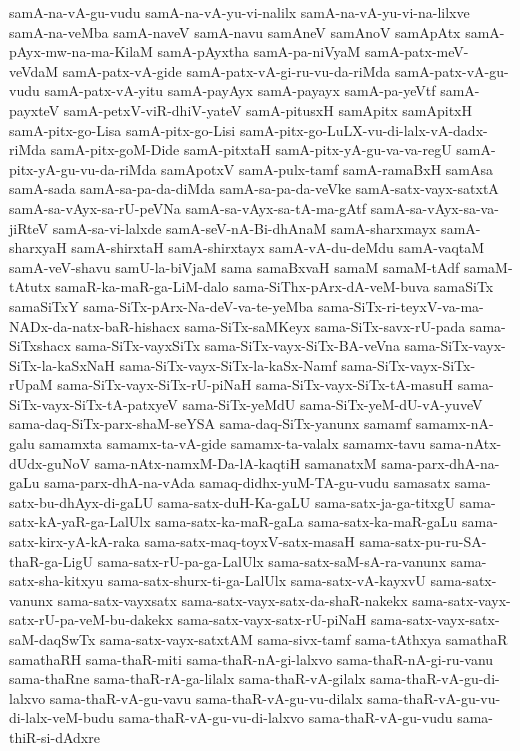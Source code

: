 {samA-na-vA-gu-vudu
samA-na-vA-yu-vi-nalilx
samA-na-vA-yu-vi-na-lilxve
samA-na-veMba
samA-naveV
samA-navu
samAneV
samAnoV
samApAtx
samA-pAyx-mw-na-ma-KilaM
samA-pAyxtha
samA-pa-niVyaM
samA-patx-meV-veVdaM
samA-patx-vA-gide
samA-patx-vA-gi-ru-vu-da-riMda
samA-patx-vA-gu-vudu
samA-patx-vA-yitu
samA-payAyx
samA-payayx
samA-pa-yeVtf
samA-payxteV
samA-petxV-viR-dhiV-yateV
samA-pitusxH
samApitx
samApitxH
samA-pitx-go-Lisa
samA-pitx-go-Lisi
samA-pitx-go-LuLX-vu-di-lalx-vA-dadx-riMda
samA-pitx-goM-Dide
samA-pitxtaH
samA-pitx-yA-gu-va-va-regU
samA-pitx-yA-gu-vu-da-riMda
samApotxV
samA-pulx-tamf
samA-ramaBxH
samAsa
samA-sada
samA-sa-pa-da-diMda
samA-sa-pa-da-veVke
samA-satx-vayx-satxtA
samA-sa-vAyx-sa-rU-peVNa
samA-sa-vAyx-sa-tA-ma-gAtf
samA-sa-vAyx-sa-va-jiRteV
samA-sa-vi-lalxde
samA-seV-nA-Bi-dhAnaM
samA-sharxmayx
samA-sharxyaH
samA-shirxtaH
samA-shirxtayx
samA-vA-du-deMdu
samA-vaqtaM
samA-veV-shavu
samU-la-biVjaM
sama
samaBxvaH
samaM
samaM-tAdf
samaM-tAtutx
samaR-ka-maR-ga-LiM-dalo
sama-SiThx-pArx-dA-veM-buva
samaSiTx
samaSiTxY
sama-SiTx-pArx-Na-deV-va-te-yeMba
sama-SiTx-ri-teyxV-va-ma-NADx-da-natx-baR-hishacx
sama-SiTx-saMKeyx
sama-SiTx-savx-rU-pada
sama-SiTxshacx
sama-SiTx-vayxSiTx
sama-SiTx-vayx-SiTx-BA-veVna
sama-SiTx-vayx-SiTx-la-kaSxNaH
sama-SiTx-vayx-SiTx-la-kaSx-Namf
sama-SiTx-vayx-SiTx-rUpaM
sama-SiTx-vayx-SiTx-rU-piNaH
sama-SiTx-vayx-SiTx-tA-masuH
sama-SiTx-vayx-SiTx-tA-patxyeV
sama-SiTx-yeMdU
sama-SiTx-yeM-dU-vA-yuveV
sama-daq-SiTx-parx-shaM-seYSA
sama-daq-SiTx-yanunx
samamf
samamx-nA-galu
samamxta
samamx-ta-vA-gide
samamx-ta-valalx
samamx-tavu
sama-nAtx-dUdx-guNoV
sama-nAtx-namxM-Da-lA-kaqtiH
samanatxM
sama-parx-dhA-na-gaLu
sama-parx-dhA-na-vAda
samaq-didhx-yuM-TA-gu-vudu
samasatx
sama-satx-bu-dhAyx-di-gaLU
sama-satx-duH-Ka-gaLU
sama-satx-ja-ga-titxgU
sama-satx-kA-yaR-ga-LalUlx
sama-satx-ka-maR-gaLa
sama-satx-ka-maR-gaLu
sama-satx-kirx-yA-kA-raka
sama-satx-maq-toyxV-satx-masaH
sama-satx-pu-ru-SA-thaR-ga-LigU
sama-satx-rU-pa-ga-LalUlx
sama-satx-saM-sA-ra-vanunx
sama-satx-sha-kitxyu
sama-satx-shurx-ti-ga-LalUlx
sama-satx-vA-kayxvU
sama-satx-vanunx
sama-satx-vayxsatx
sama-satx-vayx-satx-da-shaR-nakekx
sama-satx-vayx-satx-rU-pa-veM-bu-dakekx
sama-satx-vayx-satx-rU-piNaH
sama-satx-vayx-satx-saM-daqSwTx
sama-satx-vayx-satxtAM
sama-sivx-tamf
sama-tAthxya
samathaR
samathaRH
sama-thaR-miti
sama-thaR-nA-gi-lalxvo
sama-thaR-nA-gi-ru-vanu
sama-thaRne
sama-thaR-rA-ga-lilalx
sama-thaR-vA-gilalx
sama-thaR-vA-gu-di-lalxvo
sama-thaR-vA-gu-vavu
sama-thaR-vA-gu-vu-dilalx
sama-thaR-vA-gu-vu-di-lalx-veM-budu
sama-thaR-vA-gu-vu-di-lalxvo
sama-thaR-vA-gu-vudu
sama-thiR-si-dAdxre
}
